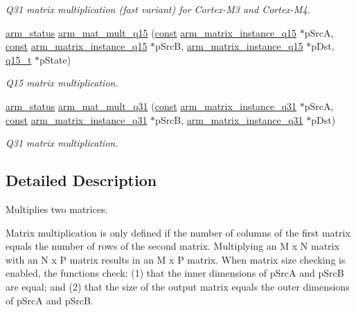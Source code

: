 \begin{DoxyCompactItemize}
\begin{DoxyCompactList}\small\item\em Q31 matrix multiplication (fast variant) for Cortex-\/\-M3 and Cortex-\/\-M4. \end{DoxyCompactList}\item 
\hyperlink{arm__math_8h_a5e459c6409dfcd2927bb8a57491d7cf6}{arm\-\_\-status} \hyperlink{group___matrix_mult_ga7521d59196189bb6dde26e8cdfb66e21}{arm\-\_\-mat\-\_\-mult\-\_\-q15} (\hyperlink{group___n_a_m_e_ga7ae6d0e43244213b34de2c2b9aa30da6}{const} \hyperlink{structarm__matrix__instance__q15}{arm\-\_\-matrix\-\_\-instance\-\_\-q15} $\ast$p\-Src\-A, \hyperlink{group___n_a_m_e_ga7ae6d0e43244213b34de2c2b9aa30da6}{const} \hyperlink{structarm__matrix__instance__q15}{arm\-\_\-matrix\-\_\-instance\-\_\-q15} $\ast$p\-Src\-B, \hyperlink{structarm__matrix__instance__q15}{arm\-\_\-matrix\-\_\-instance\-\_\-q15} $\ast$p\-Dst, \hyperlink{arm__math_8h_ab5a8fb21a5b3b983d5f54f31614052ea}{q15\-\_\-t} $\ast$p\-State)
\begin{DoxyCompactList}\small\item\em Q15 matrix multiplication. \end{DoxyCompactList}\item 
\hyperlink{arm__math_8h_a5e459c6409dfcd2927bb8a57491d7cf6}{arm\-\_\-status} \hyperlink{group___matrix_mult_ga2ec612a8c2c4916477fb9bc1ab548a6e}{arm\-\_\-mat\-\_\-mult\-\_\-q31} (\hyperlink{group___n_a_m_e_ga7ae6d0e43244213b34de2c2b9aa30da6}{const} \hyperlink{structarm__matrix__instance__q31}{arm\-\_\-matrix\-\_\-instance\-\_\-q31} $\ast$p\-Src\-A, \hyperlink{group___n_a_m_e_ga7ae6d0e43244213b34de2c2b9aa30da6}{const} \hyperlink{structarm__matrix__instance__q31}{arm\-\_\-matrix\-\_\-instance\-\_\-q31} $\ast$p\-Src\-B, \hyperlink{structarm__matrix__instance__q31}{arm\-\_\-matrix\-\_\-instance\-\_\-q31} $\ast$p\-Dst)
\begin{DoxyCompactList}\small\item\em Q31 matrix multiplication. \end{DoxyCompactList}\end{DoxyCompactItemize}


\subsection{Detailed Description}
Multiplies two matrices.



Matrix multiplication is only defined if the number of columns of the first matrix equals the number of rows of the second matrix. Multiplying an {\ttfamily M x N} matrix with an {\ttfamily N x P} matrix results in an {\ttfamily M x P} matrix. When matrix size checking is enabled, the functions check\-: (1) that the inner dimensions of {\ttfamily p\-Src\-A} and {\ttfamily p\-Src\-B} are equal; and (2) that the size of the output matrix equals the outer dimensions of {\ttfamily p\-Src\-A} and {\ttfamily p\-Src\-B}. 

